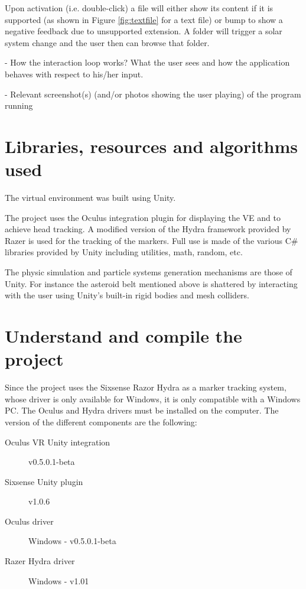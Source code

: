 \documentclass[paper=a4, fontsize=11pt]{scrartcl} %
\numberwithin{equation}{section} %
\numberwithin{figure}{section} %
\numberwithin{table}{section} %
\begin{document}
Upon activation (i.e. double-click) a file will either show its content if it is supported (as shown in Figure \ref{fig:textfile} for a text file) or bump to show a negative feedback due to unsupported extension. A folder will trigger a solar system change and the user then can browse that folder.

- How the interaction loop works? What the user sees and how the application behaves with respect to his/her input.

- Relevant screenshot(s) (and/or photos showing the user playing) of the program running


\section{Libraries, resources and algorithms used}
The virtual environment was built using Unity.

The project uses the Oculus integration plugin for displaying the VE and to achieve head tracking. A modified version of the Hydra framework provided by Razer is used for the tracking of the markers. Full use is made of the various C\# libraries provided by Unity including utilities, math, random, etc.

The physic simulation and particle systems generation mechanisms are those of Unity. For instance the asteroid belt mentioned above is shattered by interacting with the user using Unity's built-in rigid bodies and mesh colliders.

	
	\section{Understand and compile the project}
	Since the project uses the Sixsense Razor Hydra as a marker tracking system, whose driver is only available for Windows, it is only compatible with a Windows PC. The Oculus and Hydra drivers must be installed on the computer. The version of the different components are the following:
	\begin{description}
		\item[Oculus VR Unity integration] v0.5.0.1-beta
		\item[Sixsense Unity plugin] v1.0.6
		\item[Oculus driver] Windows - v0.5.0.1-beta
		\item[Razer Hydra driver] Windows - v1.01
	\end{description}
	
\end{document}
